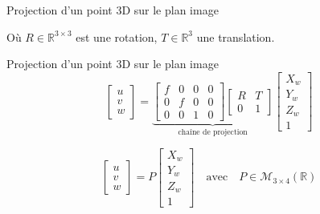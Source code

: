 \begin{frame}[noframenumbering]{Projection d’un point 3D sur le plan image}
\begin{minipage}[c]{0.48\linewidth}
\begin{overlayarea}{\linewidth}{5cm}
{      Où $R \in \mathbb{R}^{3\times3}$ est une rotation, $T \in \mathbb{R}^3$ une translation.
    }
  \end{overlayarea}
\end{minipage}
\hfill
\begin{minipage}[c]{0.48\linewidth}
  \centering
  \begin{overlayarea}{0.9\linewidth}{4cm}
    \hspace*{-1cm}
    \begin{tikzpicture}[x=0.75pt,y=0.75pt,yscale=-1,xscale=1, scale=0.6]
      
    \end{tikzpicture}
  \end{overlayarea}
\end{minipage}
\end{frame}


\begin{frame}[noframenumbering]{Projection d’un point 3D sur le plan image}
  \centering
  \[
    \begin{bmatrix}
    u \\ v \\ w
    \end{bmatrix}
    =
    \underbrace{
    \begin{bmatrix}
    f & 0 & 0 & 0 \\
    0 & f & 0 & 0 \\
    0 & 0 & 1 & 0
    \end{bmatrix}
    \begin{bmatrix}
    R & T \\
    0 & 1
    \end{bmatrix}
    }_{\text{chaîne de projection}}
    \begin{bmatrix}
    X_w \\ Y_w \\ Z_w \\ 1
    \end{bmatrix}
  \]
  
  \pause
  \[
    \begin{bmatrix}
    u \\ v \\ w
    \end{bmatrix}
    =
    P
    \begin{bmatrix}
    X_w \\ Y_w \\ Z_w \\ 1
    \end{bmatrix}
    \quad \text{avec} \quad
    P \in \mathcal{M}_{3 \times 4}(\mathbb{R})
  \]
\end{frame}



